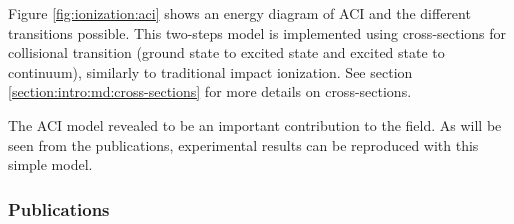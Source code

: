 

Figure \ref{fig:ionization:aci} shows an energy diagram of ACI and the
different transitions possible. This two-steps model is implemented using
cross-sections for collisional transition (ground state to excited state and
excited state to continuum), similarly to traditional impact
ionization. See section \ref{section:intro:md:cross-sections} for more
details on cross-sections.

The ACI model revealed to be an important contribution to the field. As will be
seen from the publications, experimental results can be reproduced with this
simple model.



\subsubsection{Publications}

